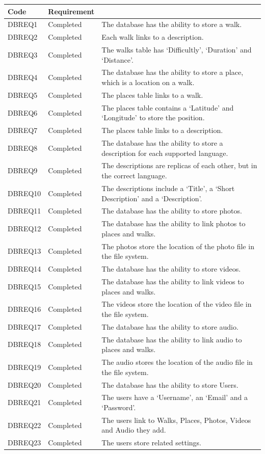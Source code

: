 \documentclass[11pt,a4paper]{article}
\begin{document}
\begin{longtable}{ p{}|p{}|p{} }
\textbf{Code} & \textbf{Requirement} \\
\hline
DBREQ1 & Completed & The database has the ability to store a walk.\\ \hline
DBREQ2 & Completed & Each walk links to a description.  \\ \hline
DBREQ3 & Completed & The walks table has `Difficultly', `Duration' and `Distance'. \\ \hline
DBREQ4 & Completed & The database has the ability to store a place, which is a location on a walk.\\ \hline
DBREQ5 & Completed & The places table links to a walk.\\ \hline
DBREQ6 & Completed & The places table contains a `Latitude' and `Longitude' to store the position. \\ \hline
DBREQ7 & Completed & The places table links to a description. \\ \hline
DBREQ8 & Completed & The database has the ability to store a description for each supported language. \\ \hline
DBREQ9 & Completed & The descriptions are replicas of each other, but in the correct language. \\ \hline
DBREQ10 & Completed & The descriptions include a `Title', a `Short Description' and a `Description'.\\ \hline
DBREQ11 & Completed & The database has the ability to store photos. \\ \hline
DBREQ12 & Completed & The database has the ability to link photos to places and walks.\\ \hline
DBREQ13 & Completed & The photos store the location of the photo file in the file system.\\ \hline
DBREQ14 & Completed & The database has the ability to store videos. \\ \hline
DBREQ15 & Completed & The database has the ability to link videos to places and walks.\\ \hline
DBREQ16 & Completed & The videos store the location of the video file in the file system.\\ \hline
DBREQ17 & Completed & The database has the ability to store audio. \\ \hline
DBREQ18 & Completed & The database has the ability to link audio to places and walks.\\ \hline
DBREQ19 & Completed & The audio stores the location of the audio file in the file system.\\ \hline
DBREQ20 & Completed & The database has the ability to store Users. \\ \hline
DBREQ21 & Completed & The users have a `Username', an `Email' and a `Password'.\\ \hline
DBREQ22 & Completed & The users link to Walks, Places, Photos, Videos and Audio they add. \\ \hline
DBREQ23 & Completed & The users store related settings. \\ \hline

\end{longtable}
\end{document}
